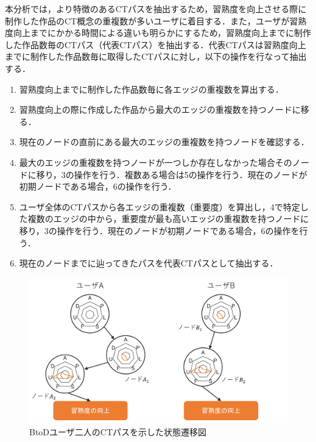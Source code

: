 \documentclass[submit,ses,noauthor]{ipsj}
\begin{document}
本分析では，より特徴のあるCTパスを抽出するため，習熟度を向上させる際に制作した作品のCT概念の重複数が多いユーザに着目する．また，ユーザが習熟度向上までにかかる時間による違いも明らかにするため，習熟度向上までに制作した作品数毎のCTパス（代表CTパス）を抽出する．代表CTパスは習熟度向上までに制作した作品数毎に取得したCTパスに対し，以下の操作を行なって抽出する．
\begin{enumerate}
    \item 習熟度向上までに制作した作品数毎に各エッジの重複数を算出する．
    \item 習熟度向上の際に作成した作品から最大のエッジの重複数を持つノードに移る．
    \item 現在のノードの直前にある最大のエッジの重複数を持つノードを確認する．
    \item 最大のエッジの重複数を持つノードが一つしか存在しなかった場合そのノードに移り，3の操作を行う．複数ある場合は5の操作を行う．現在のノードが初期ノードである場合，6の操作を行う．
    \item ユーザ全体のCTパスから各エッジの重複数（重要度）を算出し，4で特定した複数のエッジの中から，重要度が最も高いエッジの重複数を持つノードに移り，3の操作を行う．現在のノードが初期ノードである場合，6の操作を行う．
    \item 現在のノードまでに辿ってきたパスを代表CTパスとして抽出する．
\end{enumerate}



\begin{figure}[t]
	\centering
	\includegraphics[width=1.0\linewidth]{Okamoto_fig/digraph.pdf}
	\caption{BtoDユーザ二人のCTパスを示した状態遷移図}
	\label{fig:digraph}
\end{figure}
\end{document}
